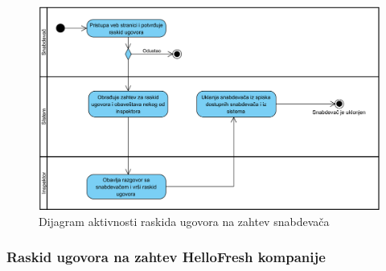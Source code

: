 \begin{figure}[H]
\begin{center}
\includegraphics[width=\textwidth]{Pictures/activity_supplier_contract_termination_1.png}
\end{center}
    \caption{Dijagram aktivnosti raskida ugovora na zahtev snabdevača}
\label{fig:ActivitySupplierContractTermination1}
\end{figure}

\subsubsection{Raskid ugovora na zahtev HelloFresh kompanije}

